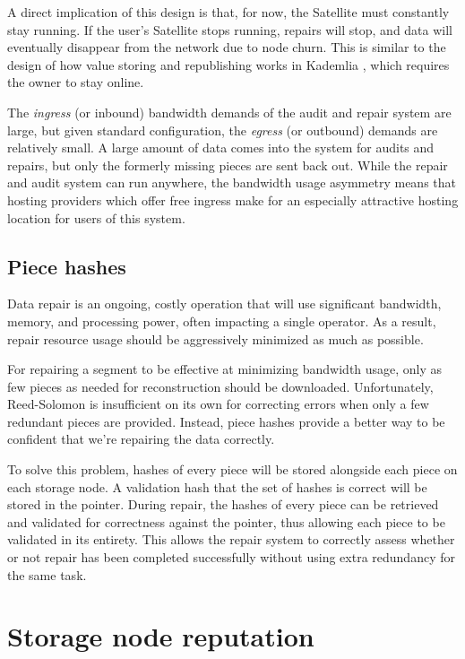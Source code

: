 \documentclass[8pt,fleqn,openany]{book}
\begin{document}
A direct implication of this design is that, for now, the Satellite must
constantly stay running. If the user's Satellite stops running, repairs will
stop, and data will eventually disappear from the network due to node churn.
This is similar to the design of how value storing and republishing works in
Kademlia \cite{kad}, which requires the owner to stay online.

The {\em ingress} (or inbound) bandwidth demands of the audit and repair system are large, but
given standard configuration, the {\em egress} (or outbound) demands are relatively small.
A large amount of data comes into the system for audits and repairs, but only
the formerly missing pieces are sent back out.
While the repair and audit system can run anywhere, the bandwidth usage
asymmetry means that hosting providers which offer free ingress
make for an especially attractive hosting location for users of this system.

\subsection{Piece hashes}\label{sec:concrete-piece-hashes}

Data repair is an ongoing, costly operation that will use significant
bandwidth, memory, and processing power, often impacting a single operator.
As a result, repair resource usage should be aggressively minimized as much as
possible.

For repairing a segment to be effective at minimizing bandwidth usage, only as few
pieces as needed for reconstruction should be downloaded. Unfortunately,
Reed-Solomon is insufficient on its own for correcting errors when only a few redundant
pieces are provided. Instead, piece hashes provide a better way to be
confident that we're repairing the data correctly.

To solve this problem, hashes of
every piece will be stored alongside each piece on each storage node.
A validation hash that the set of hashes is correct will be stored in the
pointer. During repair, the hashes of every piece can be retrieved and
validated for correctness against the pointer, thus allowing each piece to
be validated in its entirety. This allows the repair system to correctly assess
whether or not repair has been completed successfully without using extra
redundancy for the same task.

\section{Storage node reputation}\label{sec:concrete-reputation}
\end{document}
